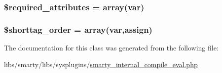 \subsubsection[{\$required\+\_\+attributes}]{\setlength{\rightskip}{0pt plus 5cm}\$required\+\_\+attributes = array(\textquotesingle{}var\textquotesingle{})}\label{class_smarty___internal___compile___eval_ae799507d5461de485f3a618abeecea95}
\hypertarget{class_smarty___internal___compile___eval_a2ccb25269c3a92e8c4796c7ef23725e6}{}
\subsubsection[{\$shorttag\+\_\+order}]{\setlength{\rightskip}{0pt plus 5cm}\$shorttag\+\_\+order = array(\textquotesingle{}var\textquotesingle{},\textquotesingle{}assign\textquotesingle{})}\label{class_smarty___internal___compile___eval_a2ccb25269c3a92e8c4796c7ef23725e6}


The documentation for this class was generated from the following file\+:\begin{DoxyCompactItemize}
\item 
libs/smarty/libs/sysplugins/\hyperlink{smarty__internal__compile__eval_8php}{smarty\+\_\+internal\+\_\+compile\+\_\+eval.\+php}\end{DoxyCompactItemize}
